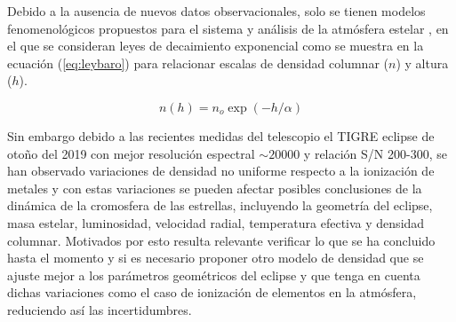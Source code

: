 \documentclass[11pt]{article}
\begin{document}

Debido a la ausencia de nuevos datos observacionales, solo se tienen modelos fenomenológicos propuestos para el sistema \cite{kps9} y  análisis de la atmósfera estelar \cite{kps1O}, \cite{complete} en el que se consideran leyes de decaimiento exponencial como se muestra en la ecuación (\ref{eq:leybaro}) para relacionar escalas de densidad columnar ($n$) y altura ($h$). 

\begin{equation}
    n(h) = n_o \exp{(-h/\alpha)}
    \label{eq:leybaro}
\end{equation}

Sin embargo debido a las recientes medidas del telescopio el TIGRE  eclipse de otoño del 2019 con mejor resolución espectral $\sim 20000$ y relación S/N 200-300, se han observado variaciones de densidad no uniforme respecto a la ionización de metales y con estas variaciones se pueden afectar posibles conclusiones de la dinámica de la cromosfera de las estrellas, incluyendo la geometría del eclipse, masa estelar, luminosidad, velocidad radial, temperatura efectiva y densidad columnar. Motivados por esto resulta relevante verificar lo que se ha concluido hasta el momento y si es necesario proponer otro modelo de densidad que se ajuste mejor a los parámetros geométricos del eclipse y que tenga en cuenta dichas variaciones como el caso de ionización de elementos en la atmósfera, reduciendo así las incertidumbres.

\end{document}
